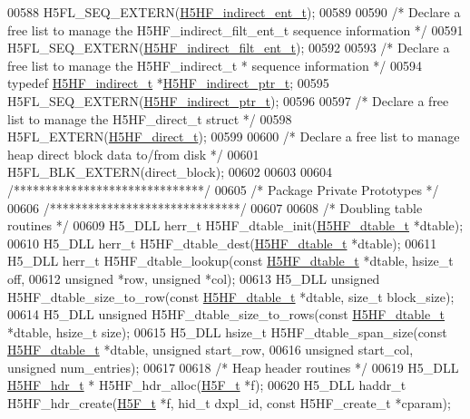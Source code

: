 \begin{DoxyCode}
00588 H5FL\_SEQ\_EXTERN(\hyperlink{struct_h5_h_f__indirect__ent__t}{H5HF\_indirect\_ent\_t});
00589 
00590 \textcolor{comment}{/* Declare a free list to manage the H5HF\_indirect\_filt\_ent\_t sequence information */}
00591 H5FL\_SEQ\_EXTERN(\hyperlink{struct_h5_h_f__indirect__filt__ent__t}{H5HF\_indirect\_filt\_ent\_t});
00592 
00593 \textcolor{comment}{/* Declare a free list to manage the H5HF\_indirect\_t * sequence information */}
00594 \textcolor{keyword}{typedef} \hyperlink{struct_h5_h_f__indirect__t}{H5HF\_indirect\_t} *\hyperlink{struct_h5_h_f__indirect__t}{H5HF\_indirect\_ptr\_t};
00595 H5FL\_SEQ\_EXTERN(\hyperlink{struct_h5_h_f__indirect__t}{H5HF\_indirect\_ptr\_t});
00596 
00597 \textcolor{comment}{/* Declare a free list to manage the H5HF\_direct\_t struct */}
00598 H5FL\_EXTERN(\hyperlink{struct_h5_h_f__direct__t}{H5HF\_direct\_t});
00599 
00600 \textcolor{comment}{/* Declare a free list to manage heap direct block data to/from disk */}
00601 H5FL\_BLK\_EXTERN(direct\_block);
00602 
00603 
00604 \textcolor{comment}{/******************************/}
00605 \textcolor{comment}{/* Package Private Prototypes */}
00606 \textcolor{comment}{/******************************/}
00607 
00608 \textcolor{comment}{/* Doubling table routines */}
00609 H5\_DLL herr\_t H5HF\_dtable\_init(\hyperlink{struct_h5_h_f__dtable__t}{H5HF\_dtable\_t} *dtable);
00610 H5\_DLL herr\_t H5HF\_dtable\_dest(\hyperlink{struct_h5_h_f__dtable__t}{H5HF\_dtable\_t} *dtable);
00611 H5\_DLL herr\_t H5HF\_dtable\_lookup(\textcolor{keyword}{const} \hyperlink{struct_h5_h_f__dtable__t}{H5HF\_dtable\_t} *dtable, hsize\_t off,
00612     \textcolor{keywordtype}{unsigned} *row, \textcolor{keywordtype}{unsigned} *col);
00613 H5\_DLL \textcolor{keywordtype}{unsigned} H5HF\_dtable\_size\_to\_row(\textcolor{keyword}{const} \hyperlink{struct_h5_h_f__dtable__t}{H5HF\_dtable\_t} *dtable, \textcolor{keywordtype}{size\_t} block\_size);
00614 H5\_DLL \textcolor{keywordtype}{unsigned} H5HF\_dtable\_size\_to\_rows(\textcolor{keyword}{const} \hyperlink{struct_h5_h_f__dtable__t}{H5HF\_dtable\_t} *dtable, hsize\_t size);
00615 H5\_DLL hsize\_t H5HF\_dtable\_span\_size(\textcolor{keyword}{const} \hyperlink{struct_h5_h_f__dtable__t}{H5HF\_dtable\_t} *dtable, \textcolor{keywordtype}{unsigned} start\_row,
00616     \textcolor{keywordtype}{unsigned} start\_col, \textcolor{keywordtype}{unsigned} num\_entries);
00617 
00618 \textcolor{comment}{/* Heap header routines */}
00619 H5\_DLL \hyperlink{struct_h5_h_f__hdr__t}{H5HF\_hdr\_t} * H5HF\_hdr\_alloc(\hyperlink{struct_h5_f__t}{H5F\_t} *f);
00620 H5\_DLL haddr\_t H5HF\_hdr\_create(\hyperlink{struct_h5_f__t}{H5F\_t} *f, hid\_t dxpl\_id, \textcolor{keyword}{const} H5HF\_create\_t *cparam);

\end{DoxyCode}
